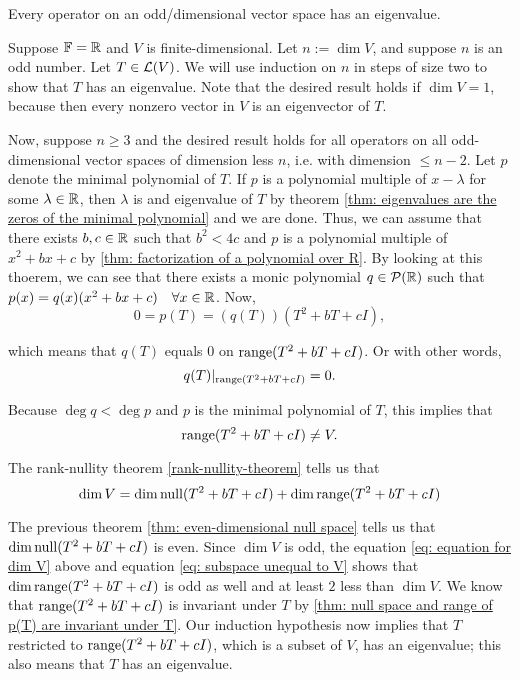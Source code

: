 \begin{thm}
  Every operator on an odd\-/dimensional vector space has an eigenvalue.
\end{thm}
\begin{prf}
  Suppose $\mathbb{F} = \mathbb{R}$ and $V$ is finite-dimensional. Let $n := \dim V$, and suppose $n$ is an odd number. Let $T \in \mathcal{L}(V)$. We will use induction on $n$ in steps of size two to show that $T$ has an eigenvalue. Note that the desired result holds if $\dim V = 1$, because then every nonzero vector in $V$ is an eigenvector of $T$.

  Now, suppose $n \geq 3$ and the desired result holds for all operators on all odd-dimensional vector spaces of dimension less $n$, i.e. with dimension $\leq n-2$. Let $p$ denote the minimal polynomial of $T$. If $p$ is a polynomial multiple of $x-\lambda$ for some $\lambda \in \mathbb{R}$, then $\lambda$ is and eigenvalue of $T$ by theorem \ref{thm: eigenvalues are the zeros of the minimal polynomial} and we are done. Thus, we can assume that there exists $b, c \in \mathbb{R}$ such that $b^2 < 4c$ and $p$ is a polynomial multiple of $x^2 + bx + c$ by \ref{thm: factorization of a polynomial over R}. By looking at this thoerem, we can see that there exists a monic polynomial $q \in \mathcal{P}(\mathbb{R})$ such that $p(x) = q(x)(x^2 + bx + c) \quad \forall x \in \mathbb{R}$. Now,
  \begin{equation}
    0 = p(T) = (q(T)) (T^2 + bT + cI),
  \end{equation}

  which means that $q(T)$ equals $0$ on $\operatorname{range}(T^2 + bT + cI)$. Or with other words,
  \begin{equation}
    q(T)|_{\operatorname{range}(T^2 + bT + cI)} = 0.
  \end{equation}

  Because $\deg q < \deg p$ and $p$ is the minimal polynomial of $T$, this implies that
  \begin{equation}
    \label{eq: subspace unequal to V}
    \operatorname{range} (T^2 + bT + cI) \neq V.
  \end{equation}

  The rank-nullity theorem \ref{rank-nullity-theorem} tells us that
  \begin{equation}
    \label{eq: equation for dim V}
    \dim V = \dim \operatorname{null} (T^2 + bT + cI) + \dim \operatorname{range}(T^2 + bT + cI)
  \end{equation}

  The previous theorem \ref{thm: even-dimensional null space} tells us that $\dim \operatorname{null} (T^2 + bT + cI)$ is even. Since $\dim V$ is odd, the equation \eqref{eq: equation for dim V} above and equation \eqref{eq: subspace unequal to V} shows that $\dim \operatorname{range}(T^2 + bT + cI)$ is odd as well and at least $2$ less than $\dim V$. We know that $\operatorname{range}(T^2 + bT + cI)$ is invariant under $T$ by \ref{thm: null space and range of p(T) are invariant under T}. Our induction hypothesis now implies that $T$ restricted to $\operatorname{range}(T^2 + bT + cI)$, which is a subset of $V$, has an eigenvalue; this also means that $T$ has an eigenvalue.
\end{prf}
